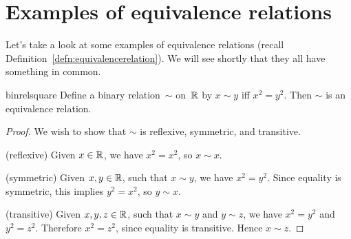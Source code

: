 
\section{Examples of equivalence relations\quad{}} 
 \label{exampleEquivRel}

Let's take a look at some examples of equivalence relations (recall Definition~\ref{defn:equivalencerelation}). We will see shortly that they all have something in common.

\begin{example}{binrelsquare}
Define a binary relation~$\sim$ on~$\mathbb{R}$ by $x \sim y$ iff $x^2 = y^2$. Then $\sim$ is an equivalence relation.

\begin{proof}
We wish to show that $\sim$ is reflexive, symmetric, and transitive.

\noindent
(reflexive) Given $x \in \mathbb{R} $, we have $x^2 = x^2$, so $x \sim x$.

\noindent
(symmetric) Given $x,y \in \mathbb{R}$, such that $x \sim y$, we have $x^2 = y^2$. Since equality is symmetric, this implies $y^2 = x^2$, so $y \sim x$.

\noindent
(transitive) Given $x,y,z \in \mathbb{R}$, such that $x \sim y$ and $y \sim z$, we have $x^2 = y^2$ and $y^2 = z^2$. Therefore $x^2 = z^2$, since equality is transitive. Hence $x \sim z$.
\end{proof}
\end{example}




